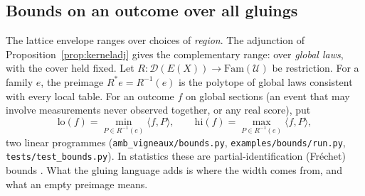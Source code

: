 \documentclass[11pt]{article}
\theoremstyle{definition}
\theoremstyle{remark}
\begin{document}
\subsection{Bounds on an outcome over all gluings}\label{sec:bounds}
The lattice envelope ranges over choices of \emph{region}. The adjunction of Proposition~\ref{prop:kerneladj} gives the complementary range: over \emph{global laws}, with the cover held fixed. Let $R:\mathcal D(E(X))\to\mathrm{Fam}(\mathcal U)$ be restriction. For a family $e$, the preimage $R^\ast e=R^{-1}(e)$ is the polytope of global laws consistent with every local table. For an outcome $f$ on global sections (an event that may involve measurements never observed together, or any real score), put
\[ \mathrm{lo}(f)=\min_{P\in R^{-1}(e)}\langle f,P\rangle,\qquad \mathrm{hi}(f)=\max_{P\in R^{-1}(e)}\langle f,P\rangle, \]
two linear programmes (\texttt{amb\_vigneaux/bounds.py}, \texttt{examples/bounds/run.py}, \texttt{tests/test\_bounds.py}). In statistics these are partial-identification (Fr\'echet) bounds \cite{frechet51,manski03}. What the gluing language adds is where the width comes from, and what an empty preimage means.
\end{document}

